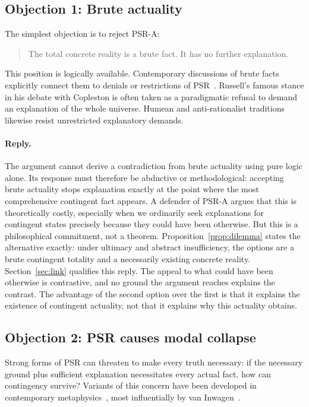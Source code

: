 \documentclass[11pt,letterpaper]{article}
\theoremstyle{plain}
\theoremstyle{definition}
\begin{document}
\subsection{Objection 1: Brute actuality}

The simplest objection is to reject PSR-A:
\begin{quote}
The total concrete reality is a brute fact. It has no further explanation.
\end{quote}

This position is logically available. Contemporary discussions of brute facts explicitly connect them to denials or restrictions of PSR~\cite{mulligan}. Russell's famous stance in his debate with Copleston is often taken as a paradigmatic refusal to demand an explanation of the whole universe. Humean and anti-rationalist traditions likewise resist unrestricted explanatory demands.

\paragraph{Reply.} The argument cannot derive a contradiction from brute actuality using pure logic alone. Its response must therefore be abductive or methodological: accepting brute actuality stops explanation exactly at the point where the most comprehensive contingent fact appears. A defender of PSR-A argues that this is theoretically costly, especially when we ordinarily seek explanations for contingent states precisely because they could have been otherwise. But this is a philosophical commitment, not a theorem. Proposition~\ref{prop:dilemma} states the alternative exactly: under ultimacy and abstract insufficiency, the options are a brute contingent totality and a necessarily existing concrete reality. Section~\ref{sec:link} qualifies this reply. The appeal to what could have been otherwise is contrastive, and no ground the argument reaches explains the contrast. The advantage of the second option over the first is that it explains the existence of contingent actuality, not that it explains why this actuality obtains.

\subsection{Objection 2: PSR causes modal collapse}
\label{obj:collapse}

Strong forms of PSR can threaten to make every truth necessary: if the necessary ground plus sufficient explanation necessitates every actual fact, how can contingency survive? Variants of this concern have been developed in contemporary metaphysics~\cite{mulligan,melamed}, most influentially by van Inwagen~\cite{vaninwagen}.
\end{document}
